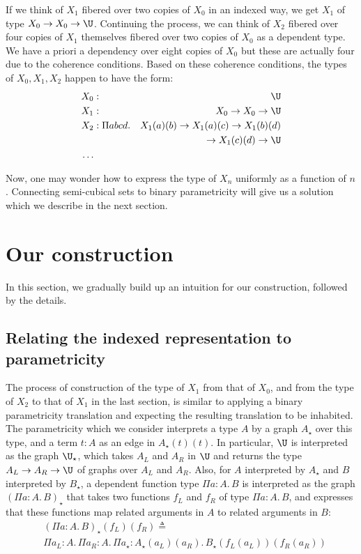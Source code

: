 \documentclass[10pt]{art.cls/art}
\newcommand{\defeq}{\ensuremath{\triangleq}}
\newcommand{\kstar}{{\star}}
\begin{document}
If we think of $X_1$ fibered over two copies of $X_0$ in an indexed way, we get $X_1$ of type $X_0 \rightarrow X_0 \rightarrow \U$. Continuing the process, we can think of $X_2$ fibered over four copies of $X_1$ themselves fibered over two copies of $X_0$ as a dependent type. We have a priori a dependency over eight copies of $X_0$ but these are actually four due to the coherence conditions. Based on these coherence conditions, the types of $X_0, X_1, X_2$ happen to have the form:
\begin{align*}
  X_0 & :              & \U                                                     \\
  X_1 & :              & X_0 \rightarrow X_0 \rightarrow \U                     \\
  X_2 & : \Pi a b c d. & X_1(a)(b) \rightarrow X_1(a)(c) \rightarrow X_1 (b)(d) \\
      &                & \rightarrow X_1 (c)(d) \rightarrow \U                  \\
  \ldots
\end{align*}

Now, one may wonder how to express the type of $X_n$ uniformly as a function of $n$. Connecting semi-cubical sets to binary parametricity will give us a solution which we describe in the next section.

\section{Our construction}
In this section, we gradually build up an intuition for our construction, followed by the details.

\subsection{Relating the indexed representation to parametricity}
The process of construction of the type of $X_1$ from that of $X_0$, and from the type of $X_2$ to that of $X_1$ in the last section, is similar to applying a binary parametricity translation and expecting the resulting translation to be inhabited. The parametricity which we consider interprets a type $A$ by a graph $A_\kstar$ over this type, and a term $t: A$ as an edge in $A_\kstar(t)(t)$. In particular, $\U$ is interpreted as the graph ${\U}_\kstar$, which takes $A_L$ and $A_R$ in $\U$ and returns the type $A_L \rightarrow A_R \rightarrow \U$ of graphs over $A_L$ and $A_R$. Also, for $A$ interpreted by $A_\kstar$ and $B$ interpreted by $B_\kstar$, a dependent function type $\Pi a: A.\, B$ is interpreted as the graph $(\Pi a: A.\, B)_\kstar$ that takes two functions $f_L$ and $f_R$ of type $\Pi a: A.\, B$, and expresses that these functions map related arguments in $A$ to related arguments in $B$:
\begin{align*}
   & (\Pi a: A.\, B)_\kstar(f_L)(f_R) \defeq                                                      \\
   & \Pi a_L: A.\, \Pi a_R: A.\, \Pi a_\kstar: A_\kstar(a_L)(a_R).\, B_\kstar(f_L(a_L))(f_R(a_R))
\end{align*}
\end{document}
